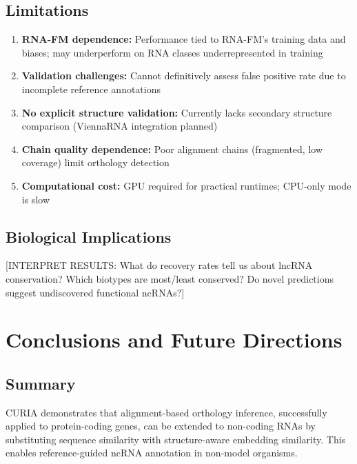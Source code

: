 \documentclass[11pt]{article}
\begin{document}
\subsection{Limitations}
\begin{enumerate}
\item \textbf{RNA-FM dependence:} Performance tied to RNA-FM's training data and biases; may underperform on RNA classes underrepresented in training
\item \textbf{Validation challenges:} Cannot definitively assess false positive rate due to incomplete reference annotations
\item \textbf{No explicit structure validation:} Currently lacks secondary structure comparison (ViennaRNA integration planned)
\item \textbf{Chain quality dependence:} Poor alignment chains (fragmented, low coverage) limit orthology detection
\item \textbf{Computational cost:} GPU required for practical runtimes; CPU-only mode is slow
\end{enumerate}

\subsection{Biological Implications}
[INTERPRET RESULTS: What do recovery rates tell us about lncRNA conservation? Which biotypes are most/least conserved? Do novel predictions suggest undiscovered functional ncRNAs?]

\section{Conclusions and Future Directions}

\subsection{Summary}
CURIA demonstrates that alignment-based orthology inference, successfully applied to protein-coding genes, can be extended to non-coding RNAs by substituting sequence similarity with structure-aware embedding similarity. This enables reference-guided ncRNA annotation in non-model organisms.
\end{document}
